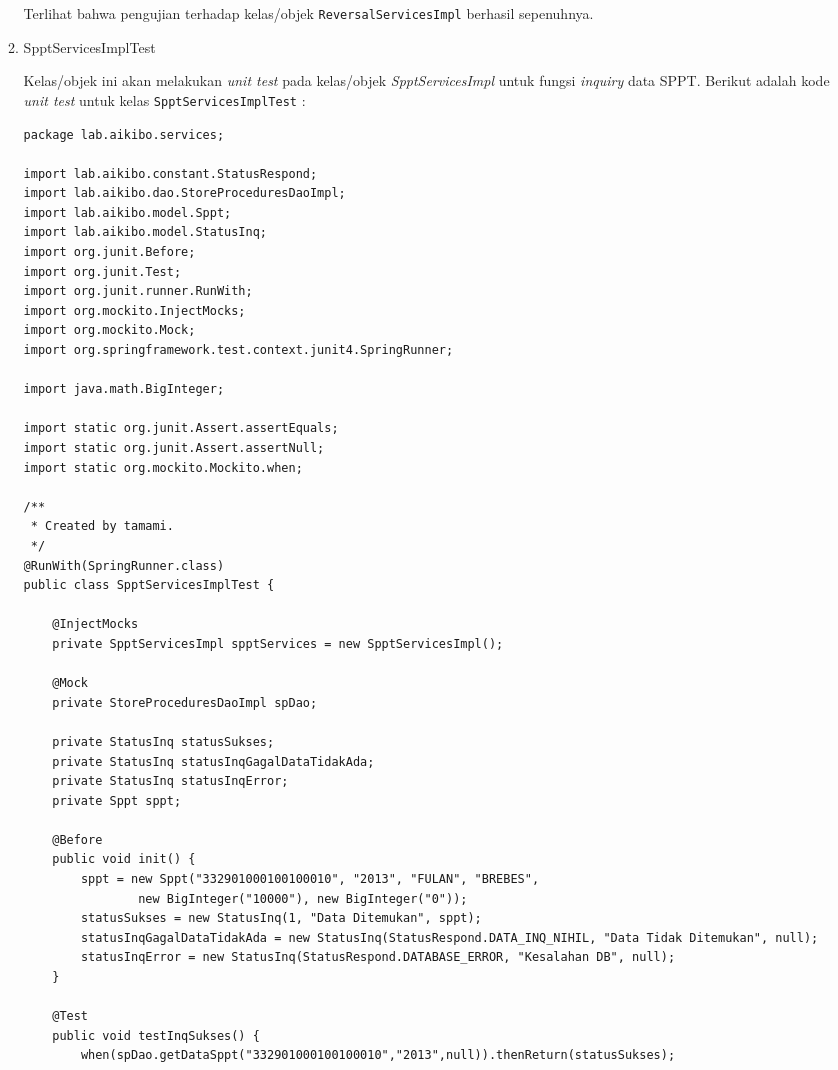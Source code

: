 \documentclass[pdftex,12pt, oneside]{article}
\begin{document}
\begin{enumerate}[A.]
\begin{enumerate}[1.]
    Terlihat bahwa pengujian terhadap kelas/objek \texttt{ReversalServicesImpl} berhasil sepenuhnya.
    
    \item SpptServicesImplTest
    
    Kelas/objek ini akan melakukan \textit{unit test} pada kelas/objek \textit{SpptServicesImpl} untuk fungsi \textit{inquiry} data SPPT. Berikut adalah kode \textit{unit test} untuk kelas \texttt{SpptServicesImplTest} :
    
    \begin{lstlisting}
package lab.aikibo.services;

import lab.aikibo.constant.StatusRespond;
import lab.aikibo.dao.StoreProceduresDaoImpl;
import lab.aikibo.model.Sppt;
import lab.aikibo.model.StatusInq;
import org.junit.Before;
import org.junit.Test;
import org.junit.runner.RunWith;
import org.mockito.InjectMocks;
import org.mockito.Mock;
import org.springframework.test.context.junit4.SpringRunner;

import java.math.BigInteger;

import static org.junit.Assert.assertEquals;
import static org.junit.Assert.assertNull;
import static org.mockito.Mockito.when;

/**
 * Created by tamami.
 */
@RunWith(SpringRunner.class)
public class SpptServicesImplTest {

    @InjectMocks
    private SpptServicesImpl spptServices = new SpptServicesImpl();

    @Mock
    private StoreProceduresDaoImpl spDao;

    private StatusInq statusSukses;
    private StatusInq statusInqGagalDataTidakAda;
    private StatusInq statusInqError;
    private Sppt sppt;

    @Before
    public void init() {
        sppt = new Sppt("332901000100100010", "2013", "FULAN", "BREBES",
                new BigInteger("10000"), new BigInteger("0"));
        statusSukses = new StatusInq(1, "Data Ditemukan", sppt);
        statusInqGagalDataTidakAda = new StatusInq(StatusRespond.DATA_INQ_NIHIL, "Data Tidak Ditemukan", null);
        statusInqError = new StatusInq(StatusRespond.DATABASE_ERROR, "Kesalahan DB", null);
    }

    @Test
    public void testInqSukses() {
        when(spDao.getDataSppt("332901000100100010","2013",null)).thenReturn(statusSukses);


\end{lstlisting}
\end{enumerate}
\end{enumerate}
\end{document}
